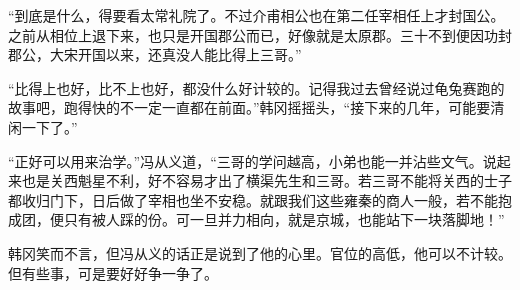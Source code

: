 “到底是什么，得要看太常礼院了。不过介甫相公也在第二任宰相任上才封国公。之前从相位上退下来，也只是开国郡公而已，好像就是太原郡。三十不到便因功封郡公，大宋开国以来，还真没人能比得上三哥。”

“比得上也好，比不上也好，都没什么好计较的。记得我过去曾经说过龟兔赛跑的故事吧，跑得快的不一定一直都在前面。”韩冈摇摇头，“接下来的几年，可能要清闲一下了。”

“正好可以用来治学。”冯从义道，“三哥的学问越高，小弟也能一并沾些文气。说起来也是关西魁星不利，好不容易才出了横渠先生和三哥。若三哥不能将关西的士子都收归门下，日后做了宰相也坐不安稳。就跟我们这些雍秦的商人一般，若不能抱成团，便只有被人踩的份。可一旦并力相向，就是京城，也能站下一块落脚地！”

韩冈笑而不言，但冯从义的话正是说到了他的心里。官位的高低，他可以不计较。但有些事，可是要好好争一争了。


